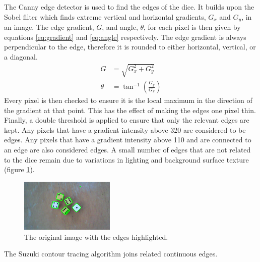 \documentclass[conference]{IEEEtran}
\begin{document}
The Canny edge detector \cite{Canny1986} is used to find the edges of the dice.
It builds upon the Sobel filter \cite{Sobel2014} which finds extreme vertical and horizontal gradients, $G_x$ and $G_y$, in an image.
The edge gradient, $G$, and angle, $\theta$, for each pixel is then given by equations \ref{eq:gradient} and \ref{eq:angle} respectively.
The edge gradient is always perpendicular to the edge, therefore it is rounded to either horizontal, vertical, or a diagonal.
\begin{align}
	G &= \sqrt{G_x^2 + G_y^2} \label{eq:gradient} \\[1em]
	\theta &= \tan^{-1}\left(\frac{G_y}{G_x}\right) \label{eq:angle}
\end{align}
Every pixel is then checked to ensure it is the local maximum in the direction of the gradient at that point.
This has the effect of making the edges one pixel thin.
Finally, a double threshold is applied to ensure that only the relevant edges are kept.
Any pixels that have a gradient intensity above 320 are considered to be edges.
Any pixels that have a gradient intensity above 110 and are connected to an edge are also considered edges.
A small number of edges that are not related to the dice remain due to variations in lighting and background surface texture (figure \ref{fig:canny}).
\begin{figure}
	\centering
	\includegraphics[width=0.4\textwidth]{canny}
	\caption{The original image with the edges highlighted.}
	\label{fig:canny}
\end{figure}

The Suzuki contour tracing algorithm \cite{Suzuki1985} joins related continuous edges.
\end{document}
